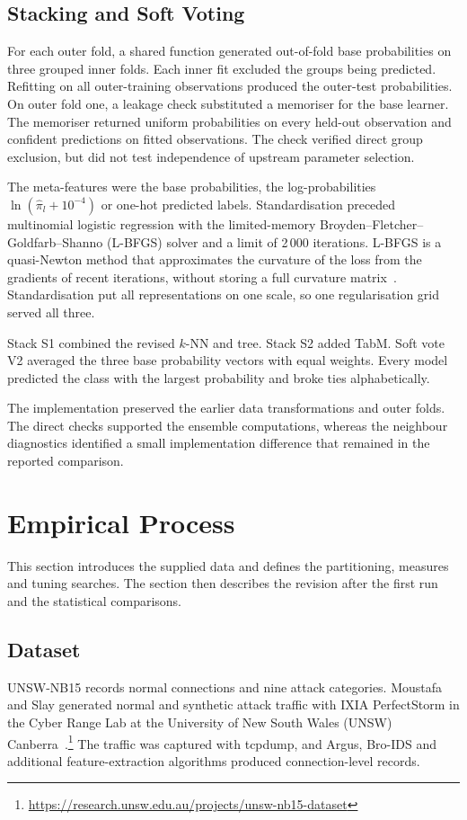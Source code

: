 \documentclass[conference]{IEEEtran}
\newcommand{\knn}{\mbox{$k$-NN}}
\begin{document}
\subsection{Stacking and Soft Voting}
For each outer fold, a shared function generated out-of-fold base probabilities on three grouped inner folds. Each inner fit excluded the groups being predicted. Refitting on all outer-training observations produced the outer-test probabilities. On outer fold one, a leakage check substituted a memoriser for the base learner. The memoriser returned uniform probabilities on every held-out observation and confident predictions on fitted observations. The check verified direct group exclusion, but did not test independence of upstream parameter selection.

The meta-features were the base probabilities, the log-probabilities $\ln(\hat{\pi}_l+10^{-4})$ or one-hot predicted labels. Standardisation preceded multinomial logistic regression with the limited-memory Broyden--Fletcher--Goldfarb--Shanno (L-BFGS) solver and a limit of 2\,000 iterations. L-BFGS is a quasi-Newton method that approximates the curvature of the loss from the gradients of recent iterations, without storing a full curvature matrix~\cite{goodfellow2016}. Standardisation put all representations on one scale, so one regularisation grid served all three.

Stack S1 combined the revised \knn{} and tree. Stack S2 added TabM. Soft vote V2 averaged the three base probability vectors with equal weights. Every model predicted the class with the largest probability and broke ties alphabetically.

The implementation preserved the earlier data transformations and outer folds. The direct checks supported the ensemble computations, whereas the neighbour diagnostics identified a small implementation difference that remained in the reported comparison.

\section{Empirical Process}
This section introduces the supplied data and defines the partitioning, measures and tuning searches. The section then describes the revision after the first run and the statistical comparisons.

\subsection{Dataset}
UNSW-NB15 records normal connections and nine attack categories. Moustafa and Slay generated normal and synthetic attack traffic with IXIA PerfectStorm in the Cyber Range Lab at the University of New South Wales (UNSW) Canberra~\cite{moustafa2015}.\footnote{\url{https://research.unsw.edu.au/projects/unsw-nb15-dataset}} The traffic was captured with tcpdump, and Argus, Bro-IDS and additional feature-extraction algorithms produced connection-level records.
\end{document}

